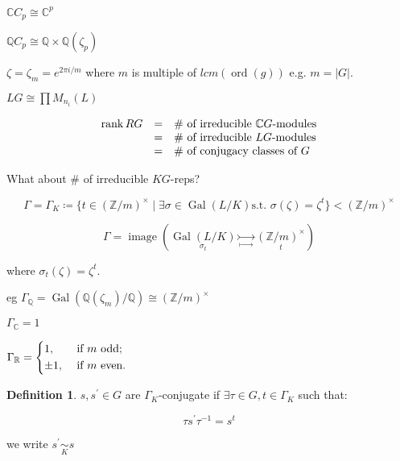 \documentclass{article}
\theoremstyle{definition}
\newtheorem*{definition}{Definition}
\begin{document}
\(\mathbb{C} C_p \cong \mathbb{C}^p\) 

\(\mathbb{Q} C_p \cong \mathbb{Q} \times \mathbb{Q}(\zeta_p)\)

\(\zeta = \zeta_m = e^{2\pi i / m}\) where \(m\) is multiple of \(lcm(\operatorname{ord}(g))\) e.g. \(m = \vert G \vert\).

\begin{center}
\end{center}

\(LG \cong \prod M_{n_i} (L)\)

\[
    \begin{array}{rcl}
        \rank RG & = & \# \text{ of irreducible } \mathbb{C} G \text{-modules}  \\
         & = &  \# \text{ of irreducible } LG \text{-modules} \\
         & = & \# \text{ of conjugacy classes of } G   \\
    \end{array}
\]

What about \(\#\) of irreducible \(KG\)-reps?

\[
    \Gamma = \Gamma_K \coloneqq \{ t\in (\mathbb{Z} / m)^\times \mid \exists \sigma \in \operatorname{Gal}(L / K) \text{s.t. } \sigma(\zeta) = \zeta^t\} < (\mathbb{Z} / m)^\times
\]

\[
    \Gamma = \operatorname{image} (\underset{\sigma_t}{\operatorname{Gal}(L / K)} \underset{\mapsto}{\rightarrowtail} \underset{t}{(\mathbb{Z} / m)^\times}) 
\]

where \(\sigma_t(\zeta) = \zeta^t\).

eg \(\Gamma_\mathbb{Q} = \operatorname{Gal}(\mathbb{Q}(\zeta_m) / \mathbb{Q}) \cong (\mathbb{Z} / m)^\times\)

\(\Gamma_\mathbb{C} = 1\)

\(\Gamma_\mathbb{R} = \begin{dcases}
    1, &\text{ if } m \text{ odd}  ;\\
    \pm 1, &\text{ if } m \text{ even}.
\end{dcases}\) 

\begin{definition}
    \(s, s^{\prime} \in G\) are \(\Gamma_K\)-conjugate if \(\exists \tau \in G, t \in \Gamma_K\) such that:

    \[
        \tau s^{\prime} \tau ^{-1} = s^t
    \]

    we write \(s^{\prime} \underset{K}{\sim} s\) 
\end{definition}
\end{document}
